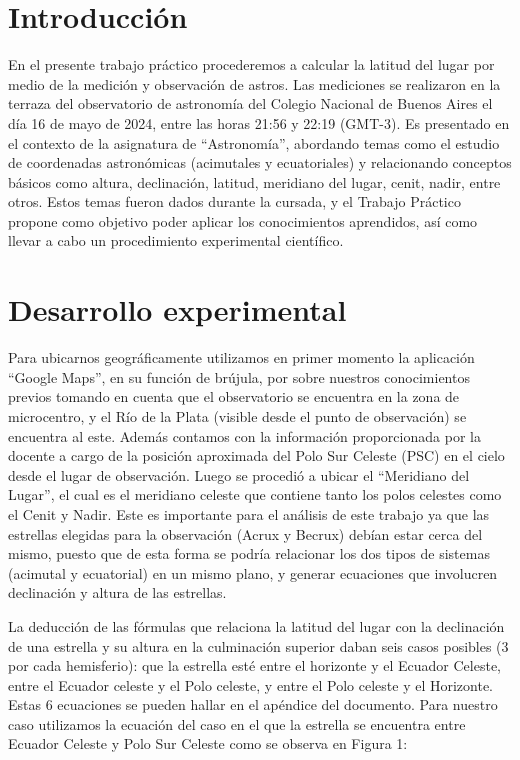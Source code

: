 \documentclass[11pt, a4paper]{article} %
\begin{document}
\section{Introducción}
En el presente trabajo práctico procederemos a calcular la latitud del lugar por medio de la medición y observación de astros. 
Las mediciones se realizaron en la terraza del observatorio de astronomía del Colegio Nacional de Buenos Aires el día 16 de mayo de 2024, entre las horas 21:56 y 22:19 (GMT-3). 
Es presentado en el contexto de la asignatura de “Astronomía”, abordando temas como el estudio de coordenadas astronómicas (acimutales y ecuatoriales) y relacionando conceptos básicos como altura, declinación, latitud, meridiano del lugar, cenit, nadir, entre otros.
Estos temas fueron dados durante la cursada, y el Trabajo Práctico propone como objetivo poder aplicar los conocimientos aprendidos, así como llevar a cabo un procedimiento experimental científico.


\section{Desarrollo experimental}
Para ubicarnos geográficamente utilizamos en primer momento la aplicación “Google Maps”, en su función de brújula, por sobre nuestros conocimientos previos tomando en cuenta que el observatorio se encuentra en la zona de microcentro, y el Río de la Plata (visible desde el punto de observación) se encuentra al este. Además contamos con la información proporcionada por la docente a cargo de la posición aproximada del Polo Sur Celeste (PSC) en el cielo desde el lugar de observación. Luego se procedió a ubicar el “Meridiano del Lugar”, el cual es el meridiano celeste que contiene tanto los polos celestes como el Cenit y Nadir. Este es importante para el análisis de este trabajo ya que las estrellas elegidas para la observación (Acrux y Becrux) debían estar cerca del mismo, puesto que de esta forma se podría relacionar los dos tipos de sistemas (acimutal y ecuatorial) en un mismo plano, y generar ecuaciones que involucren declinación y altura de las estrellas. 

La deducción de las fórmulas que relaciona la latitud del lugar con la declinación de una estrella y su altura en la culminación superior daban seis casos posibles (3 por cada hemisferio): que la estrella esté entre el horizonte y el Ecuador Celeste, entre el Ecuador celeste y el Polo celeste, y entre el Polo celeste y el Horizonte. Estas 6 ecuaciones se pueden hallar en el apéndice del documento. 
Para nuestro caso utilizamos la ecuación del caso en el que la estrella se encuentra entre Ecuador Celeste y Polo Sur Celeste como se observa en Figura 1:
\end{document}
